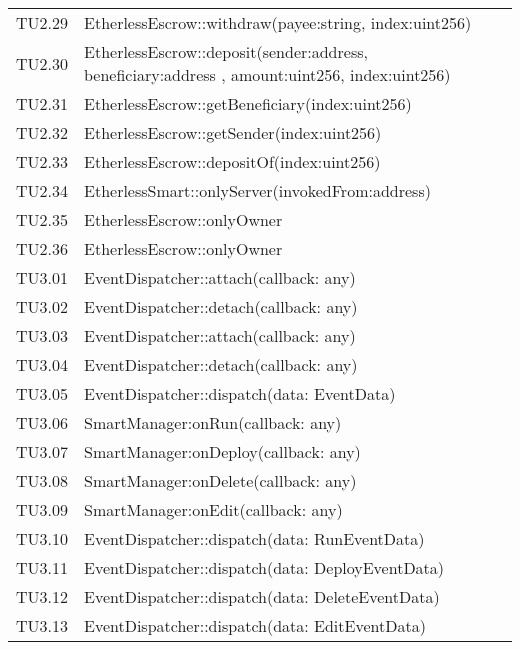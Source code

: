 \begin{longtable}{
		>{\centering}p{}
		>{}p{}}
	TU2.29 &  EtherlessEscrow::withdraw(payee:string, index:uint256)  \tabularnewline
	
	TU2.30 &  EtherlessEscrow::deposit(sender:address, beneficiary:address , amount:uint256, index:uint256)  \tabularnewline
	
	TU2.31 &  EtherlessEscrow::getBeneficiary(index:uint256)  \tabularnewline
	
	TU2.32 &  EtherlessEscrow::getSender(index:uint256)  \tabularnewline
	
	TU2.33 &  EtherlessEscrow::depositOf(index:uint256)  \tabularnewline
	
	TU2.34 &  EtherlessSmart::onlyServer(invokedFrom:address)  \tabularnewline
	
	TU2.35 &  EtherlessEscrow::onlyOwner  \tabularnewline
	
	TU2.36 &  EtherlessEscrow::onlyOwner  \tabularnewline
	
	TU3.01 & EventDispatcher::attach(callback: any) \\
	
	TU3.02 & EventDispatcher::detach(callback: any) \\
	
	TU3.03 & EventDispatcher::attach(callback: any) \\
	
	TU3.04 & EventDispatcher::detach(callback: any) \\
	
	TU3.05 & EventDispatcher::dispatch(data: EventData) \\
	
	TU3.06 & SmartManager:onRun(callback: any) \\
	
	TU3.07 & SmartManager:onDeploy(callback: any) \\
	
	TU3.08 & SmartManager:onDelete(callback: any) \\
	
	TU3.09 & SmartManager:onEdit(callback: any) \\
	
	TU3.10 & EventDispatcher::dispatch(data: RunEventData) \\
	
	TU3.11 & EventDispatcher::dispatch(data: DeployEventData) \\
	
	TU3.12 & EventDispatcher::dispatch(data: DeleteEventData) \\
	
	TU3.13 & EventDispatcher::dispatch(data: EditEventData) \\
	

\end{longtable}
